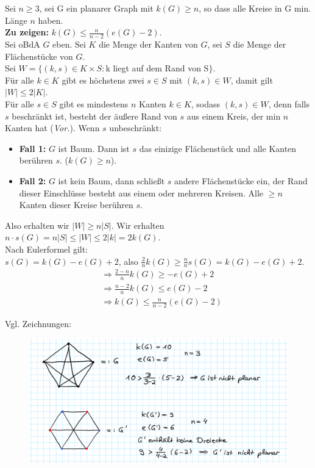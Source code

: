 \begin{problem*}[1a]
Sei $ n \geq 3 $, sei G ein planarer Graph mit $ k(G) \geq n $, so dass alle Kreise in G min. Länge $ n $ haben.\\
\textbf{Zu zeigen:} $ k(G) \leq \frac{n}{n-2}(e(G) - 2) $.\\
Sei oBdA $ G $ eben. Sei $ K $ die Menge der Kanten von $ G $, sei $ S $ die Menge der Flächenstücke von $ G $.\\
Sei $ W = \{ (k,s) \in K \times S : $k liegt auf dem Rand von S$ \} $.\\
Für alle $k \in K$ gibt es höchstens zwei $s \in S$ mit $ (k,s) \in W $, damit gilt $ \vert W \vert \leq 2 \vert K \vert $. \\
Für alle $ s \in S$ gibt es mindestens $ n $ Kanten $k \in K$, sodass $ (k,s) \in W $, denn falls $ s $ beschränkt ist, besteht der äußere Rand von $ s $ aus einem Kreis, der min $ n $ Kanten hat (\emph{Vor.}). Wenn $ s $ unbeschränkt:
\begin{itemize}
   \item \textbf{Fall 1:} $ G $ ist Baum. Dann ist $ s $ das einizige Flächenstück und alle Kanten berühren $ s $. ($ k(G) \geq n$).
   \item \textbf{Fall 2:} $ G $ ist kein Baum, dann schließt $ s $ andere Flächenstücke ein, der Rand dieser Einschlüsse besteht aus einem oder mehreren Kreisen. Alle $ \geq n $ Kanten dieser Kreise berühren $ s $.
 \end{itemize} 
Also erhalten wir $ \vert W \vert \geq n \vert S \vert $. Wir erhalten $ n \cdot s(G) = n\vert S \vert \leq \vert W \vert \leq 2 \vert k \vert = 2k(G)$.\\
Nach Eulerformel gilt:\\
$s(G) = k(G) - e(G) + 2$, also $ \frac{2}{n}k(G) \geq \frac{n}{n} s(G) = k(G) - e(G) + 2$.
\begin{align*}
  &\Rightarrow \frac{2-n}{n}k(G) \geq - e(G) + 2 \\
  &\Rightarrow \frac{n-2}{n}k(G) \leq e(G) - 2 \\
  &\Rightarrow k(G) \leq \frac{n}{n-2}(e(G) - 2)
\end{align*}
\end{problem*}

\begin{problem*}[1b]
Vgl. Zeichnungen:
\begin{figure}[H]
\centering
\label{abb-1b}
\includegraphics[width=\linewidth]{assets/images/Abb1-15-12.png}
\end{figure}
\end{problem*}

